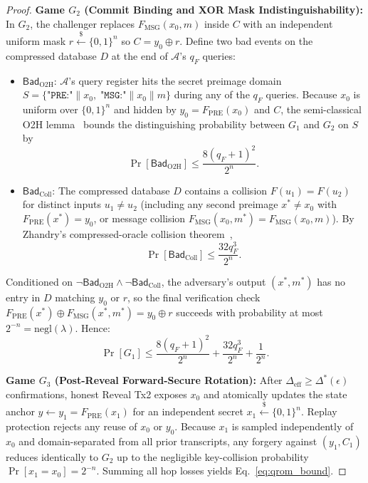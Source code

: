 \documentclass[conference,compsoc]{IEEEtran}
\begin{document}
\begin{proof}
\textbf{Game $G_2$ (Commit Binding and XOR Mask Indistinguishability):} In $G_2$, the challenger replaces $F_{\mathrm{MSG}}(x_0, m)$ inside $C$ with an independent uniform mask $r \xleftarrow{\$} \{0,1\}^n$ so $C = y_0 \oplus r$. Define two bad events on the compressed database $D$ at the end of $\mathcal{A}$'s $q_F$ queries:
\begin{itemize}
    \item $\mathsf{Bad}_{\mathrm{O2H}}$: $\mathcal{A}$'s query register hits the secret preimage domain $S = \{\texttt{"PRE:"} \parallel x_0,\; \texttt{"MSG:"} \parallel x_0 \parallel m\}$ during any of the $q_F$ queries. Because $x_0$ is uniform over $\{0,1\}^n$ and hidden by $y_0 = F_{\mathrm{PRE}}(x_0)$ and $C$, the semi-classical O2H lemma~\cite{ahu2019} bounds the distinguishing probability between $G_1$ and $G_2$ on $S$ by
    \begin{equation}
    \Pr[\mathsf{Bad}_{\mathrm{O2H}}] \le \frac{8(q_F + 1)^2}{2^n}.
    \end{equation}
    \item $\mathsf{Bad}_{\mathrm{Coll}}$: The compressed database $D$ contains a collision $F(u_1) = F(u_2)$ for distinct inputs $u_1 \ne u_2$ (including any second preimage $x^* \ne x_0$ with $F_{\mathrm{PRE}}(x^*) = y_0$, or message collision $F_{\mathrm{MSG}}(x_0, m^*) = F_{\mathrm{MSG}}(x_0, m)$). By Zhandry's compressed-oracle collision theorem~\cite{zhandry2019},
    \begin{equation}
    \Pr[\mathsf{Bad}_{\mathrm{Coll}}] \le \frac{32 q_F^3}{2^n}.
    \end{equation}
\end{itemize}
Conditioned on $\neg \mathsf{Bad}_{\mathrm{O2H}} \wedge \neg \mathsf{Bad}_{\mathrm{Coll}}$, the adversary's output $(x^*, m^*)$ has no entry in $D$ matching $y_0$ or $r$, so the final verification check $F_{\mathrm{PRE}}(x^*) \oplus F_{\mathrm{MSG}}(x^*, m^*) = y_0 \oplus r$ succeeds with probability at most $2^{-n} = \mathrm{negl}(\lambda)$. Hence:
\begin{equation}
\Pr[G_1] \le \frac{8(q_F + 1)^2}{2^n} + \frac{32 q_F^3}{2^n} + \frac{1}{2^n}.
\end{equation}

\textbf{Game $G_3$ (Post-Reveal Forward-Secure Rotation):} After $\Delta_{\text{eff}} \ge \Delta^*(\epsilon)$ confirmations, honest Reveal Tx2 exposes $x_0$ and atomically updates the state anchor $y \leftarrow y_1 = F_{\mathrm{PRE}}(x_1)$ for an independent secret $x_1 \xleftarrow{\$} \{0,1\}^n$. Replay protection rejects any reuse of $x_0$ or $y_0$. Because $x_1$ is sampled independently of $x_0$ and domain-separated from all prior transcripts, any forgery against $(y_1, C_1)$ reduces identically to $G_2$ up to the negligible key-collision probability $\Pr[x_1 = x_0] = 2^{-n}$. Summing all hop losses yields Eq.~\eqref{eq:qrom_bound}.
\end{proof}
\end{document}
